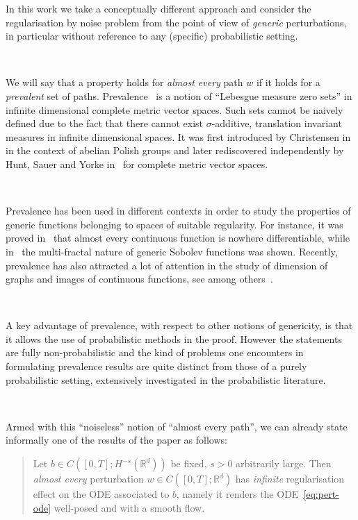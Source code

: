 \documentclass[10pt]{article}
\newcommand{\tmtextit}[1]{{\itshape{#1}}}
\newenvironment{quoteenv}{\begin{quote} }{\end{quote}}
\begin{document}
In this work we take a conceptually different approach and consider the
regularisation by noise problem from the point of view of \tmtextit{generic}
perturbations, in particular without reference to any (specific) probabilistic
setting.

\

We will say that a property holds for \tmtextit{almost every} path $w$ if it
holds for a \tmtextit{prevalent} set of paths. Prevalence~{\cite{ott}} is a
notion of ``Lebesgue measure zero sets'' in infinite dimensional complete
metric vector spaces. Such sets cannot be naively defined due to the fact that
there cannot exist $\sigma$-additive, translation invariant measures in
infinite dimensional spaces. It was first introduced by Christensen
in~{\cite{christensen}} in the context of abelian Polish groups and later
rediscovered independently by Hunt, Sauer and Yorke in~{\cite{huntsauer}} for
complete metric vector spaces.

\

Prevalence has been used in different contexts in order to study the
properties of generic functions belonging to spaces of suitable regularity.
For instance, it was proved in~{\cite{hunt}} that almost every continuous
function is nowhere differentiable, while in~{\cite{fraysse2010,fraysse2006}}
the multi-fractal nature of generic Sobolev functions was shown. Recently,
prevalence has also attracted a lot of attention in the study of dimension of
graphs and images of continuous functions, see among
others~{\cite{fraserhyde,bayart}}.

\

A key advantage of prevalence, with respect to other notions of genericity,
is that it allows the use of probabilistic methods in the proof. However the
statements are fully non-probabilistic and the kind of problems one encounters
in formulating prevalence results are quite distinct from those of a purely
probabilistic setting, extensively investigated in the probabilistic
literature.

\

Armed with this ``noiseless'' notion of ``almost every path'', we can already
state informally one of the results of the paper as follows:

\begin{quoteenv}
  Let $b \in C ([0, T] ; H^{- s} (\mathbb{R}^d))$ be fixed, $s > 0$
  arbitrarily large. Then \tmtextit{almost every} perturbation $w \in C ([0,
  T] ; \mathbb{R}^d)$ has \tmtextit{infinite} regularisation effect on the ODE
  associated to $b$, namely it renders the ODE~{\eqref{eq:pert-ode}}
  well-posed and with a smooth flow.
\end{quoteenv}
\end{document}
